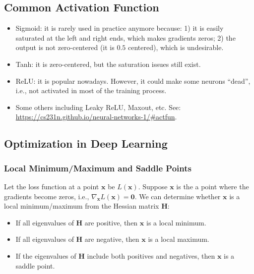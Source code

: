 \subsection{Common Activation Function}
    \begin{itemize}
        \item Sigmoid: it is rarely used in practice anymore because: 1) it is easily saturated at the left and right ends, which makes gradients zeros; 2) the output is not zero-centered (it is $0.5$ centered), which is undesirable.
        \item Tanh: it is zero-centered, but the saturation issues still exist.
        \item ReLU: it is popular nowadays. However, it could make some neurons ``dead'', i.e., not activated in most of the training process.
        \item Some others including Leaky ReLU, Maxout, etc. See: \url{https://cs231n.github.io/neural-networks-1/#actfun}.
    \end{itemize}


\subsection{Optimization in Deep Learning}
    \subsubsection{Local Minimum/Maximum and Saddle Points}
    Let the loss function at a point $\bm{x}$ be $L(\bm{x})$.
    Suppose $\bm{x}$ is the a point where the gradients become zeros, i.e., $\nabla_{\bm{x}}L(\bm{x}) = \bm{0}$.
    We can determine whether $\bm{x}$ is a local minimum/maximum from the Hessian matrix $\bm{H}$:
        \begin{itemize}
            \item If all eigenvalues of $\bm{H}$ are positive, then $\bm{x}$ is a local minimum.
            \item If all eigenvalues of $\bm{H}$ are negative, then $\bm{x}$ is a local maximum.
            \item If the eigenvalues of $\bm{H}$ include both positives and negatives, then $\bm{x}$ is a saddle point.
        \end{itemize}
        
